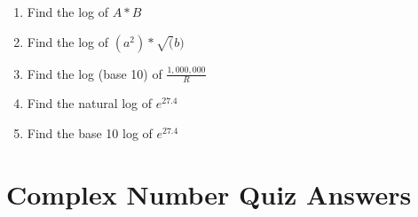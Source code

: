 \begin{enumerate}

\item  Find the log of $A*B$

\item  Find the log of $(a^2) * \sqrt(b)$

\item  Find the log (base 10) of $\frac{1,000,000}{R}$

\item  Find the natural log of $e^{27.4}$

\item  Find the base 10 log of $e^{27.4}$


\end{enumerate}






\newpage
\section{Complex Number Quiz Answers}\label{CN_answers}

